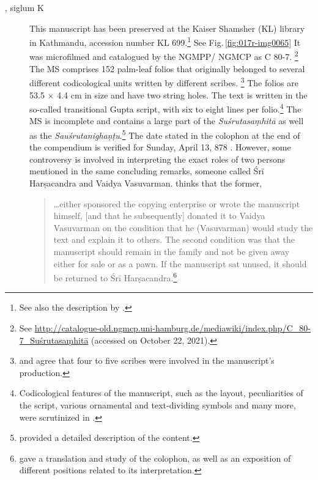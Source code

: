 \begin{description}
    
    \item[, siglum K] This manuscript has been preserved at
the Kaiser Shamsher (KL) library in Kathmandu, accession number KL
699.\footnote{See also the description by \citet[\S 2.1]{kleb-2021b}.} See
Fig.\,\ref{fig:017r-img0065} It was microfilmed and catalogued by the NGMPP/
NGMCP as C 80-7.%
\footnote{See
\url{http://catalogue-old.ngmcp.uni-hamburg.de/mediawiki/index.php/C_80-7_Suśrutasaṃhitā}
 (accessed on October 22, 2021).%
} The MS comprises 152 palm-leaf folios that originally belonged to several
different codicological units written by different scribes.%
\footnote{%
\textcites[46]{bhat-2020} and \textcites[11]{kleb-2021b} agree that four to five
scribes were involved in the manuscript's production. } The folios are 53.5
$\times$ 4.4 cm in size and have two string holes.  The text is written in the
so-called transitional Gupta script, with six to eight lines per
folio.\footnote{Codicological features of the manuscript, such as the layout,
peculiarities of the script, various ornamental and text-dividing symbols and many
more, were scrutinized in \textcites{bhat-2020}.} The MS is incomplete and
contains a large part of the \emph{Suśrutasaṃhitā} as well as the
\emph{Sauśrutanighaṇṭu}.\footnote{\textcite[11]{kleb-2021b} provided a detailed
description of the content.} The date stated in the colophon at the end of the
compendium is verified for Sunday, April 13, 878 \CE. However, some controversy is
involved in interpreting the exact roles of two persons mentioned in the same
concluding remarks, someone called Śrī Harṣacandra and Vaidya Vasuvarman.
\textcites[16]{kleb-2021b} thinks that the former,
    \begin{quote}
        \ldots either sponsored the copying enterprise or wrote the manuscript himself,
        [and that he subsequently] donated it to Vaidya Vasuvarman on the condition that
        he (Vasuvarman) would study the text and explain it to others. The second
        condition was that the manuscript should remain in the family and not be given
        away either for sale or as a pawn. If the manuscript sat unused, it should be
        returned to Śrī Harṣacandra.\footnote{\textcite[13--17]{kleb-2021b} gave a
        translation and study of the colophon, as well as an exposition of different
        positions related to its interpretation.}
    \end{quote}
    

\end{description}
